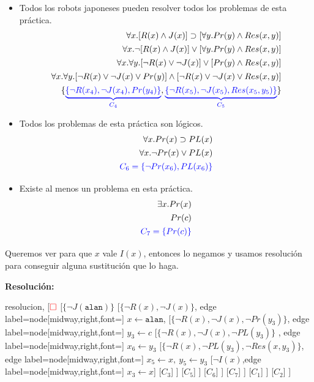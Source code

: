 \documentclass[10pt,a4paper]{article}
\begin{document}
\begin{itemize}
    \item Todos los robots japoneses pueden resolver todos los problemas de esta práctica.
        \begin{align*}
\forall x.[ R(x) \land J(x) ] \supset [\forall y. Pr(y) \land Res(x,y)] \\[1pt]
\forall x.\lnot[ R(x) \land J(x) ] \lor [\forall y. Pr(y) \land Res(x,y)] \\[1pt]
\forall x.\forall y.[\lnot R(x) \lor \lnot J(x) ] \lor [ Pr(y) \land Res(x,y)] \\[1pt]
\forall x.\forall y.[\lnot R(x) \lor \lnot J(x) \lor Pr(y) ] \land [ \lnot R(x) \lor \lnot J(x) \lor Res(x,y)] \\[1pt]
\{{\color{blue}\underbrace{\{\lnot R(x_4), \lnot J(x_4), Pr(y_4)\}}_{C_4}},{\color{blue}\underbrace{\{ \lnot R(x_5), \lnot J(x_5), Res(x_5,y_5)\}}_{C_5}}\}
       \end{align*}
\item Todos los problemas de esta práctica son lógicos.
\begin{align*}
\forall x. Pr(x) \supset PL(x) \\[1pt]
\forall x. \lnot Pr(x) \lor PL(x) \\[1pt]
{\color{blue}C_6 =\{\lnot Pr(x_6),PL(x_6)\}} \\[1pt]
\end{align*}
\item Existe al menos un problema en esta práctica.
\begin{align*}
\exists x. Pr(x) \\[1pt]
Pr(c) \\[1pt]
{\color{blue}C_7 = \{Pr(c)\}} \\[1pt]
\end{align*}
\end{itemize}
Queremos ver para que $x$ vale $I(x)$, entonces lo negamos y usamos resolución para conseguir alguna sustitución que lo haga.

\textbf{Resolución:}
\begin{center}
	\begin{forest} resolucion,
[${\color{red}\Box}$ 
	[$\{\lnot J(\texttt{alan})\}$
    	[$\{ \lnot R(x) \comma \lnot J(x)\}$, edge label={node[midway,right,font=\footnotesize] {$x\leftarrow \texttt{alan}$}},
        	[$\{ \lnot R(x) \comma \lnot J(x) \comma \lnot Pr(y_3)\}$, edge label={node[midway,right,font=\footnotesize] {$y_3\leftarrow c$}}
            	[$\{ \lnot R(x) \comma \lnot J(x) \comma \lnot PL(y_3)\}$
            	, edge label={node[midway,right,font=\footnotesize] {$x_6\leftarrow y_3$}}
                	[$\{ \lnot R(x) \comma \lnot PL(y_3) \comma \lnot Res(x\comma y_3)\}$, edge label={node[midway,right,font=\footnotesize] {$x_5\leftarrow x,~y_5\leftarrow y_3$}}
                    	[$\lnot I(x)$,edge label={node[midway,right,font=\footnotesize] {$x_3\leftarrow x$}}]
                    	[$C_3$]
                	]
                	[$C_5$]
            	]
            	[$C_6$]
        	]
        	[$C_7$]
    	]
    	[$C_1$]
	]
	[$C_2$]
]
	\end{forest}
\end{center}
\end{document}
